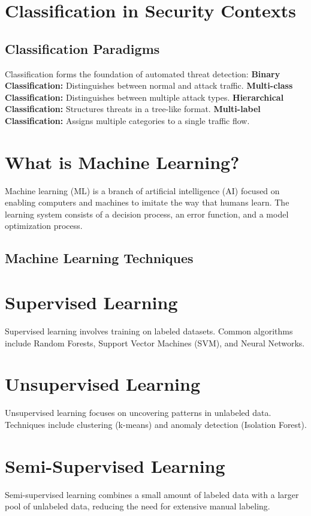 \documentclass{report}
\begin{document}
\section{Classification in Security Contexts}
\subsection{Classification Paradigms}
Classification forms the foundation of automated threat detection:
\textbf{Binary Classification:} Distinguishes between normal and attack traffic.
\textbf{Multi-class Classification:} Distinguishes between multiple attack types.
\textbf{Hierarchical Classification:} Structures threats in a tree-like format.
\textbf{Multi-label Classification:} Assigns multiple categories to a single traffic flow.

\section*{What is Machine Learning?}
Machine learning (ML) is a branch of artificial intelligence (AI) focused on enabling computers and machines to imitate the way that humans learn. The learning system consists of a decision process, an error function, and a model optimization process.

\subsection{Machine Learning Techniques}
\section*{Supervised Learning}
Supervised learning involves training on labeled datasets. Common algorithms include Random Forests, Support Vector Machines (SVM), and Neural Networks.

\section*{Unsupervised Learning}
Unsupervised learning focuses on uncovering patterns in unlabeled data. Techniques include clustering (k-means) and anomaly detection (Isolation Forest).

\section*{Semi-Supervised Learning}
Semi-supervised learning combines a small amount of labeled data with a larger pool of unlabeled data, reducing the need for extensive manual labeling.
\end{document}
